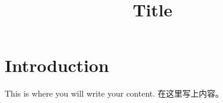 \documentclass{article}
\title{Title}
\author{}
\begin{document}
\maketitle{}

\section{Introduction}

This is where you will write your content. 在这里写上内容。
\end{document}
